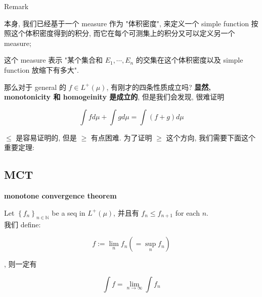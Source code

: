 \documentclass{qlnotes-export}
\begin{document}
\begin{qlremark}{Remark}

本身, 我们已经基于一个 measure 作为 "体积密度", 来定义一个 simple function 按照这个体积密度得到的积分, 而它在每个可测集上的积分又可以定义另一个 measure;

这个 measure 表示 "某个集合和 \(E_{1},\cdots,E_{n}\) 的交集在这个体积密度以及 simple function 放缩下有多大".

\end{qlremark}

那么对于 general 的 \(f \in L^{+}(\mu)\), 有刚才的四条性质成立吗? \textbf{显然, monotonicity 和 homogeinity 是成立的}, 但是我们会发现, 很难证明

\[\int f d\mu + \int g d\mu = \int(f + g) d\mu\]

\(\leq\) 是容易证明的, 但是 \(\geq\) 有点困难. 为了证明 \(\geq\) 这个方向, 我们需要下面这个重要定理:

\subsection{MCT}\label{mct}

\begin{theorem}{\protect{}\label{kn-monotone-convergence-theorem}{\textbf{monotone
convergence theorem}}}

Let \(\left\{ f_{n} \right\}_{n \in {\mathbb{N}}}\) be a seq in \(L^{+}(\mu)\), 并且有 \(f_{n} \leq f_{n + 1}\) for each \(n\).\\
我们 define:

\[f := \lim\limits_{n}f_{n}( = \sup\limits_{n}f_{n})\]

, 则一定有

\[\int f = \lim\limits_{n\rightarrow\infty}\int f_{n}\]

\end{theorem}
\end{document}
